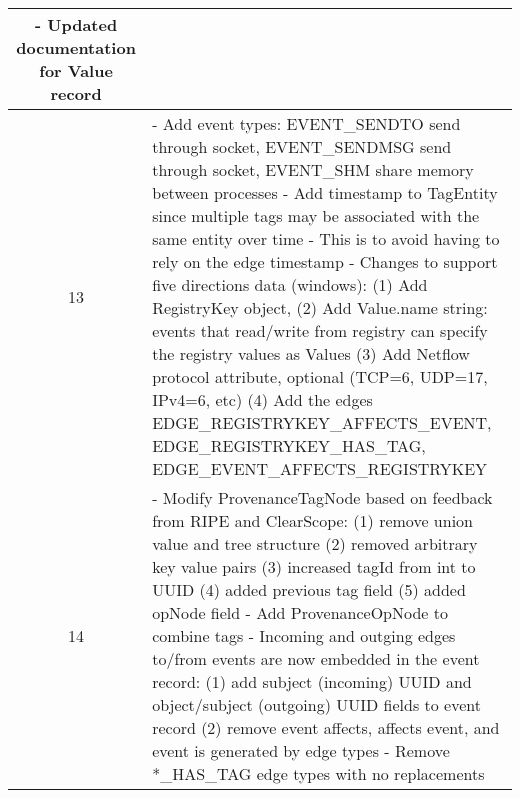 \documentclass[10pt, conference, onecolumn]{IEEEtran}
\newcommand\tab[1][1em]{\hspace*{#1}}
\begin{document}
\begin{longtable}{|c|p{17cm}|}
  - Updated documentation for Value record
\\\hline
13 & \small
  - Add event types: \newline
  \tab EVENT\_SENDTO send through socket, \newline
  \tab EVENT\_SENDMSG send through socket, \newline
  \tab EVENT\_SHM share memory between processes \newline
  - Add timestamp to TagEntity since multiple tags may be associated with the same entity over time \newline
  \tab - This is to avoid having to rely on the edge timestamp \newline
  - Changes to support five directions data (windows): \newline
  \tab (1) Add RegistryKey object, \newline 
  \tab (2)  Add Value.name string: events that read/write from registry can specify the registry values as Values \newline
  \tab (3) Add Netflow protocol attribute, optional (TCP=6, UDP=17, IPv4=6, etc) \newline
  \tab (4) Add the edges EDGE\_REGISTRYKEY\_AFFECTS\_EVENT, EDGE\_REGISTRYKEY\_HAS\_TAG, \newline
  \tab\tab\tab EDGE\_EVENT\_AFFECTS\_REGISTRYKEY 
\\\hline
14 & \small
  - Modify ProvenanceTagNode based on feedback from RIPE and ClearScope: \newline
  \tab (1) remove union value and tree structure \newline
  \tab (2) removed arbitrary key value pairs \newline
  \tab (3) increased tagId from int to UUID \newline
  \tab (4) added previous tag field \newline
  \tab (5) added opNode field\newline
  - Add ProvenanceOpNode to combine tags \newline
  - Incoming and outging edges to/from events are now embedded in the event record: \newline
  \tab (1) add subject (incoming) UUID and object/subject (outgoing) UUID fields to event record \newline
  \tab (2) remove event affects, affects event, and event is generated by edge types \newline
  - Remove *\_HAS\_TAG edge types with no replacements \newline

\end{longtable}
\end{document}
